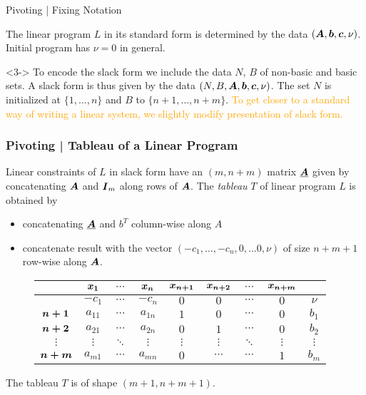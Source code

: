 \documentclass[aspectratio = 169]{beamer}
\begin{document}
\begin{frame}{Pivoting | Fixing Notation}
\begin{overlayarea}{\textwidth}{.3\textheight}
\begin{onlyenv}
          The linear program $L$ in its standard form is determined by
          the data $(\boldsymbol{A}, \boldsymbol{b}, \boldsymbol{c}, \nu)$. Initial program
          has $\nu = 0$ in general.
        \end{onlyenv}
        \begin{onlyenv}<3->
          To encode the slack form we include the data $N$, $B$ of
          non-basic and basic sets. A slack form is thus given by the
          data $(N, B, \boldsymbol{A}, \boldsymbol{b}, \boldsymbol{c}, \nu)$. The set $N$ is
          initialized at $\{1, \ldots, n\}$ and $B$ to
          $\{n+1, \ldots, n+m\}$. \pause[4] \textcolor{orange}{To get
            closer to a standard way of writing a linear system, we
            slightly modify presentation of slack form.}
        \end{onlyenv}
    \end{overlayarea}
\end{frame}

\begin{frame}
  \frametitle{Pivoting | Tableau of a Linear Program}
  Linear constraints of $L$ in slack form have an $(m, n+m)$ matrix
  $\underline{\boldsymbol{A}}$ given by concatenating $\boldsymbol{A}$ and $\boldsymbol{I}_m$
  along rows of $\boldsymbol{A}$. The \emph{tableau} $T$ of linear program $L$
  is obtained by
  \begin{itemize}
  \item<2-> concatenating $\underline{\boldsymbol{A}}$ and $b^T$ column-wise
    along $A$
  \item<3-> concatenate result with the vector
    $(-c_1, \ldots, -c_n, 0, \ldots 0, \nu)$ of size $n+m+1$ row-wise
    along $\boldsymbol{A}$.
  \end{itemize}
  \pause[4]
  \begin{figure}
    \begin{tabular}{c|ccc|cccc|c|}
       & \alert{$\boldsymbol{x_1}$} & \alert{$\cdots$} & \alert{$\boldsymbol{x_n}$} & \alert{$\boldsymbol{x_{n+1}}$} & \alert{$\boldsymbol{x_{n+2}}$} & \alert{$\cdots$} & \alert{$\boldsymbol{x_{n+m}}$} &  \\
      \hline
       & $-c_1$ & $\cdots$ & $-c_n$ & $0$ & $0$ & $\cdots$ & $0$ & $\nu$ \\
      \hline
      \alert{$\boldsymbol{n+1}$} & $a_{11}$ & $\cdots$ & $a_{1n}$ & $1$ & $0$ & $\cdots$ & $0$ & $b_1$ \\
      \alert{$\boldsymbol{n+2}$}& $a_{21}$ & $\cdots$ & $a_{2n}$ & $0$ & $1$ & $\cdots$ & $0$ & $b_2$ \\
      \alert{$\vdots$}& $\vdots$ & $\ddots$ & $\vdots$ & $\vdots$ & $\vdots$ & $\ddots$ & $\vdots$ & $\vdots$ \\
      \alert{$\boldsymbol{n+m}$} & $a_{m1}$ & $\cdots$  & $a_{mn}$  & $0$ & $\cdots$ & $\cdots$ & $1$ & $b_m$
    \end{tabular}
  \end{figure}
  The tableau $T$ is of shape $(m + 1, n + m + 1)$.
  \end{frame}
\end{document}
